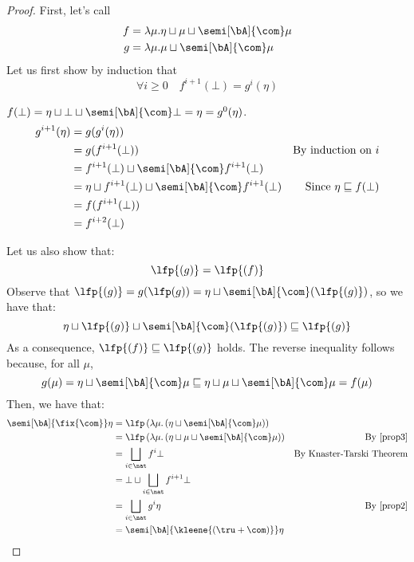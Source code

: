 \begin{proof}
  First, let's call
  \begin{align*}
    f & = \lambda \mu . \eta \sqcup \mu \sqcup \semi[\bA]{\com}\mu \\
    g & = \lambda \mu . \mu \sqcup \semi[\bA]{\com}\mu
  \end{align*}
  Let us first show by induction that 
  \begin{equation}\label{prop2}
    \forall i\geq 0 \quad f^{i+1} (\bot) = g^{i} (\eta) 
  \end{equation}

  \noindent
  \begin{inductive}
     \(f(\bot) = \eta \sqcup \bot \sqcup \semi[\bA]{\com}\bot = \eta = g^0 (\eta)\).
    \begin{align*}
      g^{i+1}(\eta) & = g (g^i (\eta)) \\
                    & = g(f^{i+1}(\bot)) & \text{By induction on } i \\
                    & = f^{i+1}(\bot) \sqcup \semi[\bA]{\com}f^{i+1}(\bot) \\
                    & = \eta \sqcup f^{i+1}(\bot) \sqcup \semi[\bA]{\com}f^{i+1}(\bot) & \text{Since } \eta \sqsubseteq f(\bot)\\
                    & = f ( f^{i+1}(\bot)) \\
                    & = f^{i+2}(\bot)
    \end{align*}
  \end{inductive}
  
  Let us also show that:
  \begin{equation}\label{prop3}
    \lfp{(g)} = \lfp{(f)}
  \end{equation}
  Observe that
  \(\lfp{(g)} = g(\lfp(g)) = \eta \sqcup
  \semi[\bA]{\com}(\lfp{(g)})\), so we have that:
  \[
    \eta \sqcup \lfp{(g)} \sqcup \semi[\bA]{\com}(\lfp{(g)})
    \sqsubseteq \lfp{(g)}
  \]
  As a consequence, \(\lfp{(f)}\sqsubseteq \lfp{(g)}\) holds. The
  reverse inequality follows because, for all \(\mu\),
  \begin{equation*}
    g(\mu) = \eta \sqcup \semi[\bA]{\com} \mu \sqsubseteq \eta \sqcup \mu \sqcup \semi[\bA]{\com} \mu = f(\mu)
  \end{equation*}
  Then, we have that:
  \begin{align*}
    \semi[\bA]{\fix{\com}} \eta & = \lfp\left({\lambda \mu. \left(\eta \sqcup \semi[\bA]{\com} \mu\right)}\right) \\
    & = \lfp\left({\lambda \mu. \left(\eta \sqcup \mu \sqcup \semi[\bA]{\com} \mu\right)}\right) &  \text{By~\eqref{prop3}}\\
    & = \bigsqcup_{i \in \nat} {f}^i \bot & \text{By Knaster-Tarski Theorem} \\
    & = \bot \sqcup \bigsqcup_{i \in \nat} {f}^{i+1} \bot \\
    & = \bigsqcup_{i \in \nat} {g}^{i} \eta & \text{By~\eqref{prop2}}\\
    & = \semi[\bA]{\kleene{\left(\tru + \com\right)}} \eta
  \end{align*}  
\end{proof}

